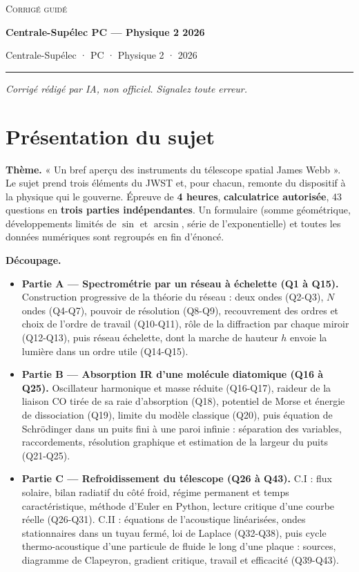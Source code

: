 \documentclass[11pt,a4paper]{article}
\providecommand{\tightlist}{\setlength{\itemsep}{0pt}\setlength{\parskip}{0pt}}
\begin{document}
\thispagestyle{plain}
\begin{center}
  {\small\scshape Corrigé guidé}\par\smallskip
  {\LARGE\bfseries Centrale-Supélec PC — Physique 2 2026\par}\medskip
  {\large Centrale-Supélec · PC · Physique 2 · 2026\par}
\end{center}
\vspace{2pt}\hrule\vspace{8pt}

\emph{Corrigé rédigé par IA, non officiel. Signalez toute erreur.}

\hypertarget{pruxe9sentation-du-sujet}{%
\section{Présentation du sujet}\label{pruxe9sentation-du-sujet}}

\textbf{Thème.} « Un bref aperçu des instruments du télescope spatial James Webb ». Le sujet prend trois éléments du JWST et, pour chacun, remonte du dispositif à la physique qui le gouverne. Épreuve de \textbf{4 heures}, \textbf{calculatrice autorisée}, 43 questions en \textbf{trois parties indépendantes}. Un formulaire (somme géométrique, développements limités de \(\sin\) et \(\arcsin\), série de l'exponentielle) et toutes les données numériques sont regroupés en fin d'énoncé.

\textbf{Découpage.}

\begin{itemize}
\tightlist
\item
  \textbf{Partie A --- Spectrométrie par un réseau à échelette (Q1 à Q15).} Construction progressive de la théorie du réseau : deux ondes (Q2-Q3), \(N\) ondes (Q4-Q7), pouvoir de résolution (Q8-Q9), recouvrement des ordres et choix de l'ordre de travail (Q10-Q11), rôle de la diffraction par chaque miroir (Q12-Q13), puis réseau échelette, dont la marche de hauteur \(h\) envoie la lumière dans un ordre utile (Q14-Q15).
\item
  \textbf{Partie B --- Absorption IR d'une molécule diatomique (Q16 à Q25).} Oscillateur harmonique et masse réduite (Q16-Q17), raideur de la liaison CO tirée de sa raie d'absorption (Q18), potentiel de Morse et énergie de dissociation (Q19), limite du modèle classique (Q20), puis équation de Schrödinger dans un puits fini à une paroi infinie : séparation des variables, raccordements, résolution graphique et estimation de la largeur du puits (Q21-Q25).
\item
  \textbf{Partie C --- Refroidissement du télescope (Q26 à Q43).} C.I : flux solaire, bilan radiatif du côté froid, régime permanent et temps caractéristique, méthode d'Euler en Python, lecture critique d'une courbe réelle (Q26-Q31). C.II : équations de l'acoustique linéarisées, ondes stationnaires dans un tuyau fermé, loi de Laplace (Q32-Q38), puis cycle thermo-acoustique d'une particule de fluide le long d'une plaque : sources, diagramme de Clapeyron, gradient critique, travail et efficacité (Q39-Q43).
\end{itemize}
\end{document}
